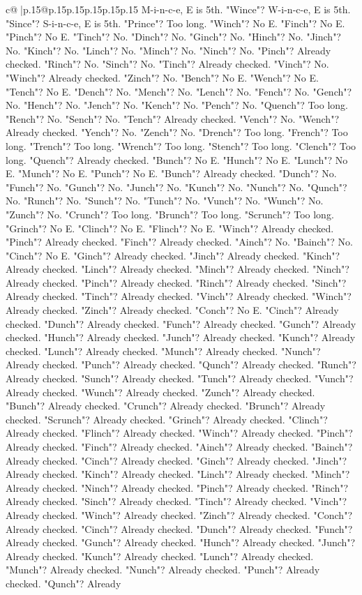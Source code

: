 \documentclass{article}
\begin{document}
{\begin{supertabular}{c@{$\;$}|p{.15\linewidth}@{}p{.15\linewidth}p{.15\linewidth}p{.15\linewidth}p{.15\linewidth}p{.15\linewidth}}
{{{M{-}i{-}n{-}c{-}e, E is 5th. "Wince"? W{-}i{-}n{-}c{-}e, E is 5th. "Since"? S{-}i{-}n{-}c{-}e, E is 5th. "Prince"? Too long. "Winch"? No E. "Finch"? No E. "Pinch"? No E. "Tinch"? No. "Dinch"? No. "Ginch"? No. "Hinch"? No. "Jinch"? No. "Kinch"? No. "Linch"? No. "Minch"? No. "Ninch"? No. "Pinch"? Already checked. "Rinch"? No. "Sinch"? No. "Tinch"? Already checked. "Vinch"? No. "Winch"? Already checked. "Zinch"? No. "Bench"? No E. "Wench"? No E. "Tench"? No E. "Dench"? No. "Mench"? No. "Lench"? No. "Fench"? No. "Gench"? No. "Hench"? No. "Jench"? No. "Kench"? No. "Pench"? No. "Quench"? Too long. "Rench"? No. "Sench"? No. "Tench"? Already checked. "Vench"? No. "Wench"? Already checked. "Yench"? No. "Zench"? No. "Drench"? Too long. "French"? Too long. "Trench"? Too long. "Wrench"? Too long. "Stench"? Too long. "Clench"? Too long. "Quench"? Already checked. "Bunch"? No E. "Hunch"? No E. "Lunch"? No E. "Munch"? No E. "Punch"? No E. "Bunch"? Already checked. "Dunch"? No. "Funch"? No. "Gunch"? No. "Junch"? No. "Kunch"? No. "Nunch"? No. "Qunch"? No. "Runch"? No. "Sunch"? No. "Tunch"? No. "Vunch"? No. "Wunch"? No. "Zunch"? No. "Crunch"? Too long. "Brunch"? Too long. "Scrunch"? Too long. "Grinch"? No E. "Clinch"? No E. "Flinch"? No E. "Winch"? Already checked. "Pinch"? Already checked. "Finch"? Already checked. "Ainch"? No. "Bainch"? No. "Cinch"? No E. "Ginch"? Already checked. "Jinch"? Already checked. "Kinch"? Already checked. "Linch"? Already checked. "Minch"? Already checked. "Ninch"? Already checked. "Pinch"? Already checked. "Rinch"? Already checked. "Sinch"? Already checked. "Tinch"? Already checked. "Vinch"? Already checked. "Winch"? Already checked. "Zinch"? Already checked. "Conch"? No E. "Cinch"? Already checked. "Dunch"? Already checked. "Funch"? Already checked. "Gunch"? Already checked. "Hunch"? Already checked. "Junch"? Already checked. "Kunch"? Already checked. "Lunch"? Already checked. "Munch"? Already checked. "Nunch"? Already checked. "Punch"? Already checked. "Qunch"? Already checked. "Runch"? Already checked. "Sunch"? Already checked. "Tunch"? Already checked. "Vunch"? Already checked. "Wunch"? Already checked. "Zunch"? Already checked. "Bunch"? Already checked. "Crunch"? Already checked. "Brunch"? Already checked. "Scrunch"? Already checked. "Grinch"? Already checked. "Clinch"? Already checked. "Flinch"? Already checked. "Winch"? Already checked. "Pinch"? Already checked. "Finch"? Already checked. "Ainch"? Already checked. "Bainch"? Already checked. "Cinch"? Already checked. "Ginch"? Already checked. "Jinch"? Already checked. "Kinch"? Already checked. "Linch"? Already checked. "Minch"? Already checked. "Ninch"? Already checked. "Pinch"? Already checked. "Rinch"? Already checked. "Sinch"? Already checked. "Tinch"? Already checked. "Vinch"? Already checked. "Winch"? Already checked. "Zinch"? Already checked. "Conch"? Already checked. "Cinch"? Already checked. "Dunch"? Already checked. "Funch"? Already checked. "Gunch"? Already checked. "Hunch"? Already checked. "Junch"? Already checked. "Kunch"? Already checked. "Lunch"? Already checked. "Munch"? Already checked. "Nunch"? Already checked. "Punch"? Already checked. "Qunch"? Already }}}
\end{supertabular}}
\end{document}
